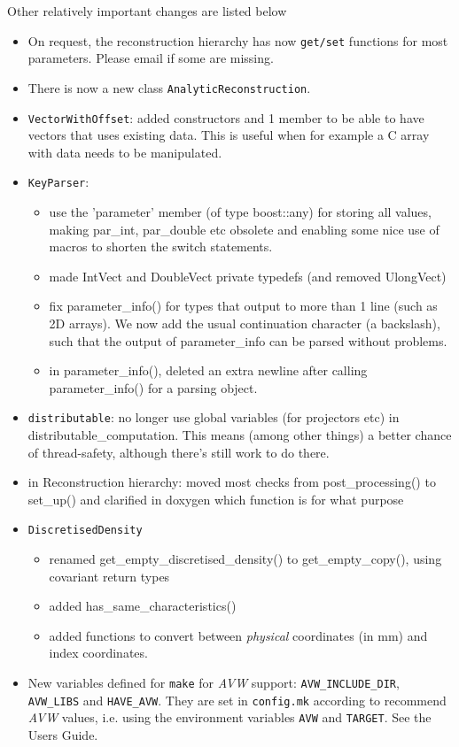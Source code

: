 \documentclass{article}
\begin{document}
Other relatively important changes are listed below
\begin{itemize}
\item On request, the reconstruction hierarchy has now \texttt{get/set} functions for 
most parameters. Please email if some are missing.
\item There is now a new class \texttt{AnalyticReconstruction}.
\item \texttt{VectorWithOffset}: added
  constructors and 1 member to be able to have vectors that uses existing
  data. This is useful when for example a C array with data needs to be
  manipulated.

\item \texttt{KeyParser}: 
  \begin{itemize} 
  \item use the 'parameter' member (of type
  boost::any) for storing all values, making par\_int, par\_double etc
  obsolete and enabling some nice use of macros to shorten the switch
  statements.  
  \item made IntVect and DoubleVect private typedefs (and removed
  UlongVect) 
  \item fix parameter\_info() for types that
  output to more than 1 line (such as 2D arrays). We now add the usual
  continuation character (a backslash), such that the output of
  parameter\_info can be parsed without problems.  
  \item in parameter\_info(),
  deleted an extra newline after calling parameter\_info() for a parsing
  object.
  \end{itemize}

\item \texttt{distributable}:
  no longer use global variables (for
  projectors etc) in distributable\_computation. This means (among other
  things) a better chance of thread-safety, although there's still work to
  do there.

\item in Reconstruction hierarchy:  moved most checks
  from post\_processing() to set\_up() and clarified in doxygen which function 
  is for what purpose

\item \texttt{DiscretisedDensity}
 \begin{itemize}
  \item renamed get\_empty\_discretised\_density() to get\_empty\_copy(), using 
  covariant return types 
  \item added has\_same\_characteristics() 
  \item added functions to convert between \textit{physical} coordinates (in mm)
    and index coordinates.
  \end{itemize}

\item New variables defined for \texttt{make} for \textit{AVW} support:
\texttt{AVW\_INCLUDE\_DIR}, \texttt{AVW\_LIBS} and \texttt{HAVE\_AVW}. They
are set in \texttt{config.mk} according to recommend \textit{AVW} values,
i.e. using the environment variables \texttt{AVW} and \texttt{TARGET}.
See the Users Guide.
\end{itemize}
\end{document}
